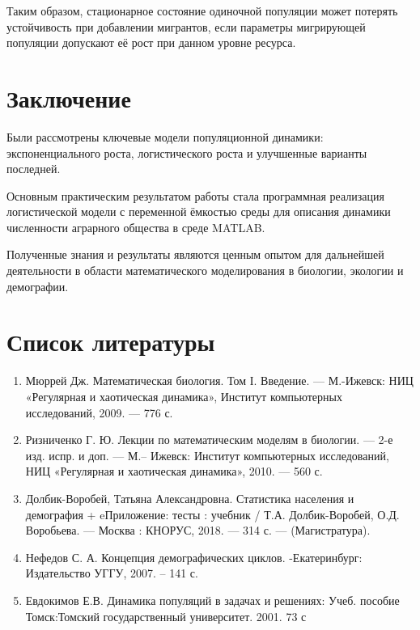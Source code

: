 \documentclass[a4paper, 14pt]{extarticle}
\begin{document}
Таким образом, стационарное состояние одиночной популяции может потерять устойчивость при добавлении мигрантов, если параметры мигрирующей популяции допускают её рост при данном уровне ресурса.

\newpage

\section*{Заключение}

Были рассмотрены ключевые модели популяционной динамики: экспоненциального роста, логистического роста и улучшенные варианты последней.

Основным практическим результатом работы стала программная реализация логистической модели с переменной ёмкостью среды для описания динамики численности аграрного общества в среде MATLAB. 

Полученные знания и результаты являются ценным опытом для дальнейшей деятельности в области математического моделирования в  биологии, экологии и демографии.

\newpage    

\section*{Список литературы}

\begin{enumerate}
    \item Мюррей Дж. Математическая биология. Том І. Введение. — М.-Ижевск: НИЦ «Регулярная и хаотическая динамика», Институт компьютерных исследований, 2009. — 776 с.

    \item Ризниченко Г. Ю. Лекции по математическим моделям в биологии. — 2-е изд. испр. и доп. — М.– Ижевск: Институт компьютерных исследований, НИЦ «Регулярная и хаотическая динамика», 2010. — 560 с. 

    \item Долбик-Воробей, Татьяна Александровна. Статистика населения и демография + eПриложение: тесты : учебник / Т.А. Долбик-Воробей, О.Д. Воробьева. — Москва : КНОРУС, 2018. — 314 с. — (Магистратура).

    \item Нефедов С. А. Концепция демографических циклов. -Екатеринбург: Издательство УГГУ, 2007. – 141 с.

    \item Евдокимов Е.В. Динамика популяций в задачах и решениях: Учеб. пособие Томск:Томский государственный университет. 2001. 73 с
\end{enumerate}
\end{document}
